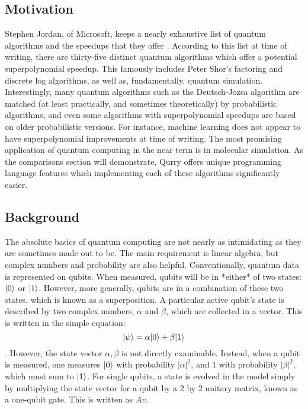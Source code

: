 \documentclass[journal]{article}
\DeclarePairedDelimiter\ket{\lvert}{\rangle}
\begin{document}
\subsection{Motivation}

Stephen Jordan, of Microsoft, keeps a nearly exhaustive list of quantum algorithms and the speedups that they offer \cite{jordan}.
According to this list at time of writing, there are thirty-five distinct quantum algorithms which offer a potential superpolynomial speedup.
This famously includes Peter Shor's factoring and discrete log algorithms, as well as, fundamentally, quantum simulation.
Interestingly, many quantum algorithms such as the Deutsch-Jozsa algorithm are matched (at least practically, and sometimes theoretically) by probabilistic algorithms, and even some algorithms with superpolynomial speedups are based on older probabilistic versions.
For instance, machine learning does not appear to have superpolynomial improvements at time of writing.
The most promising application of quantum computing in the near term is in molecular simulation.
As the comparisons section will demonstrate, Qurry offers unique programming language features which implementing each of these algorithms significantly easier.

% 

\subsection{Background}

The absolute basics of quantum computing are not nearly as intimidating as they are sometimes made out to be.
The main requirement is linear algebra, but complex numbers and probability are also helpful. 
Conventionally, quantum data is represented on qubits.
When measured, qubits will be in *either* of two states: $\ket{0}$ or $\ket{1}$.
However, more generally, qubits are in a combination of these two states, which is known as a superposition.
A particular active qubit's state is described by two complex numbers, $\alpha$ and $\beta$, which are collected in a vector.
This is written in the simple equation: $$\ket{\psi} = \alpha\ket{0} + \beta\ket{1}$$.
However, the state vector $\alpha, \beta$ is not directly examinable.
Instead, when a qubit is measured, one measures $\ket{0}$ with probability $|\alpha|^2$, and $1$ with probability $|\beta|^2$, which must sum to $\ket{1}$.
For single qubits, a state is evolved in the model simply by multiplying the state vector for a qubit by a $2$ by $2$ unitary matrix, known as a one-qubit gate. This is written as $Av$.
\end{document}
